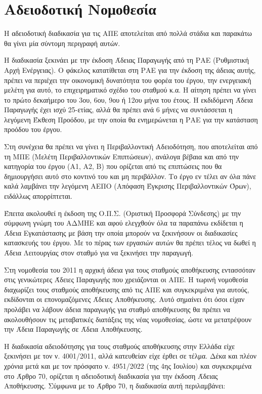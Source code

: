 \documentclass[12pt]{report}
\begin{document}
\pagebreak
\section*{Αδειοδοτική Νομοθεσία}
Η αδειοδοτική διαδικασία για τις ΑΠΕ αποτελείται από πολλά στάδια και παρακάτω θα γίνει μία σύντομη περιγραφή αυτών.

Η διαδικασία ξεκινάει με την έκδοση Άδειας Παραγωγής από τη ΡΑΕ (Ρυθμιστική Αρχή Ενέργειας). Ο φάκελος κατατίθεται στη ΡΑΕ για την έκδοση της άδειας αυτής, πρέπει να περιέχει την οικονομική δυνατότητα του φορέα του έργου, την
ενεργειακή μελέτη για αυτό, το επιχειρηματικό σχέδιο του σταθμού κ.α. Η αίτηση πρέπει να γίνει το πρώτο δεκαήμερο του 3ου, 6ου, 9ου ή 12ου μήνα του έτους. Η εκδιδόμενη Άδεια Παραγωγής έχει ισχύ 25-ετίας, αλλά θα πρέπει ανά 
6 μήνες να συντάσσεται η λεγόμενη Έκθεση Προόδου, με την οποία θα ενημερώνεται η ΡΑΕ για την κατάσταση προόδου του έργου.

Στη συνέχεια θα πρέπει να γίνει η Περιβαλλοντική Αδειοδότηση, που αποτελείται από τη ΜΠΕ (Μελέτη Περιβαλλοντικών Επιπτώσεων), ανάλογα βέβαια και από την κατηγορία του έργου (Α1, Α2, Β) που ορίζεται
από τις επιπτώσεις που θα δημιουργήσει αυτό στο κοντινό του και μη περιβάλλον. Το έργο εν τέλει αν όλα πάνε καλά λαμβάνει την λεγόμενη ΑΕΠΟ (Απόφαση Έγκρισης Περιβαλλοντικών Όρων), ειδάλλως απορρίπτεται.

Έπειτα ακολουθεί η έκδοση της Ο.Π.Σ. (Οριστική Προσφορά Σύνδεσης) με την σύμφωνη γνώμη του ΑΔΜΗΕ και αφού ελεγχθούν όλα τα παραπάνω εκδίδεται η Άδεια Εγκατάστασης με βάση την οποία μπορούν να ξεκινήσουν οι διαδικασίες
κατασκευής του έργου. Με το πέρας των εργασιών αυτών θα πρέπει τέλος να δωθεί η Άδεια Λειτουργίας στον σταθμό για να ξεκινήσει την παραγωγή.

Στη νομοθεσία του 2011 η αρχική άδεια για τους σταθμούς αποθήκευσης εντασσόταν στις γενικώτερες Άδειες Παραγωγής που χρειάζονται οι ΑΠΕ. Η τωρινή νομοθεσία διαχωρίζει τους σταθμούς αποθήκευσης από τις ΑΠΕ και συγκεκριμένα 
για αυτούς, εκδίδονται οι επονομαζόμενες Άδειες Αποθήκευσης. Αυτό σημαίνει ότι όσοι είχαν προλάβει να λάβουν άδεια παραγωγής για σταθμό αποθήκευσης θα πρέπει να ακολουθήσουν τις μεταβατικές διατάξεις της νέας νομοθεσίας, 
ώστε να μετατρέψουν την Άδεια Παραγωγής σε Άδεια Αποθήκευσης.

Η διαδικασία αδειοδότησης για τους σταθμούς αποθήκευσης στην Ελλάδα είχε ξεκινήσει με τον ν. 4001/2011, αλλά κατευθείαν είχε έρθει σε τέλμα. Δέκα και πλέον χρόνια μετά και με τον πρόσφατο ν. 4951/2022 (της 4ης Ιουλίου) και 
συγκεκριμένα στο Άρθρο 70, ορίζεται η αδειοδοτική διαδικασία για την έκδοση Άδειας Αποθήκευσης. Σύμφωνα με το Άρθρο 70, η διαδικασία αυτή περιλαμβάνει:
\end{document}
